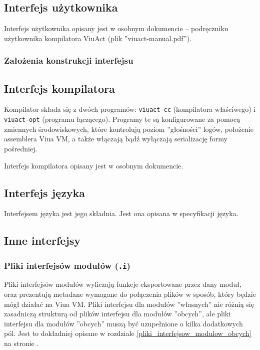 \subsection{Interfejs użytkownika}

Interfejs użytkownika opisany jest w osobnym dokumencie -- podręczniku użytkownika kompilatora ViuAct (plik
''viuact-manual.pdf'').

\subsubsection{Założenia konstrukcji interfejsu}

\subsection{Interfejs kompilatora}

Kompilator składa się z dwóch programów: \texttt{viuact-cc} (kompilatora właściwego) i \texttt{viuact-opt}
(programu łączącego). Programy te są konfigurowane za pomocą zmiennych środowiskowych, które kontrolują poziom
''głośności'' logów, położenie assemblera Viua VM, a także włączają bądź wyłączają serializację formy
pośredniej.

Interfejs kompilatora opisany jest w osobnym dokumencie.

\subsection{Interfejs języka}

Interfejsem języka jest jego składnia.
Jest ona opisana w specyfikacji języka.

\subsection{Inne interfejsy}

\subsubsection{Pliki interfejsów modułów (\texttt{.i})}
\label{pliki_interfejsow_modulow}

Pliki interfejsów modułów wyliczają funkcje eksportowane przez dany moduł, oraz prezentują metadane wymagane
do połączenia plików w sposób, który będzie mógł działać na Viua VM. Pliki interfejsu dla modułów ''własnych''
nie różnią się zasadniczą strukturą od plików interfejsu dla modułów ''obcych'', ale pliki interfejsu dla
modułów ''obcych'' muszą być uzupełnione o kilka dodatkowych pól. Jest to dokładniej opisane w rozdziale
\ref{pliki_interfejsow_modulow_obcych} na stronie \pageref{pliki_interfejsow_modulow_obcych}.

